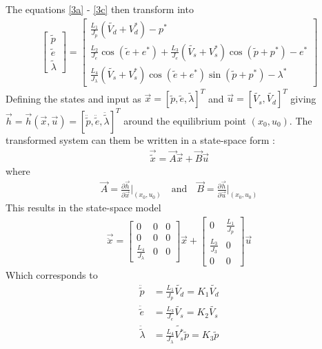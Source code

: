 %
The equations \ref{3a} - \ref{3c} then transform into
%
\setcounter{equation}{3}
\begin{align}
    \begin{bmatrix}\widetilde{p}\\\widetilde{e}\\\widetilde{\lambda} \end{bmatrix}
    = \begin{bmatrix}\frac{L_1}{J_p}(\tilde{V_d}+V_d^*) - p^*  \\ 
    \frac{L_2}{J_e}\cos(\widetilde e + e^*)+\frac{L_3}{J_e}(\tilde{V_s}+V_s^*)\cos(\widetilde{p}+p^*) - e^*  \\  
    \frac{L_4}{J_\lambda}(\tilde{V_s}+V_s^*)\cos(\widetilde{e}+e^*)\sin(\widetilde{p}+p^*) - \lambda^*  \end{bmatrix} %
\end{align}
%
Defining the states and input as $\vec{x} = [\widetilde{p},\widetilde{e},\widetilde{\lambda}]^T$ and $\vec{u} = [\tilde{V_s},\tilde{V_d}]^T$ giving $\vec{h} = \vec{h}(\vec{x},\vec{u}) = [\ddot{\widetilde{p}},\ddot{\widetilde{e}},\ddot{\widetilde{\lambda}}]^T$ around the equilibrium point $(x_0,u_0)$. The transformed system can them be written in a state-space form \cite{chen2014linear}:
%
\begin{align*}
    \vec{\widetilde{x}} = \vec{A}\vec{x} + \vec{B}\vec{u}
\end{align*}
%
where 
%
\begin{align*}
    \vec{A} = \frac{\partial\vec{h}}{\partial\vec{x}}\bigg|_{(x_0,u_0)}
    \quad\text{and}\quad
    \vec{B} = \frac{\partial\vec{h}}{\partial\vec{u}}\bigg|_{(x_0,u_0)}
\end{align*} 
%
This results in the state-space model
%
\begin{align}
    \vec{\ddot{x}} = 
    \begin{bmatrix}0&0&0\\0&0&0\\\frac{L_4}{J_\lambda}&0&0
    \end{bmatrix}
    \vec{x} + 
    \begin{bmatrix}0&\frac{L_1}{J_p}\\\frac{L_3}{J_3}&0\\0&0
    \end{bmatrix}
    \vec{u} %
\end{align}
%
Which corresponds to
\begin{subequations}
\begin{align}
    \ddot{\widetilde{p}} &= \frac{L_1}{J_p}\tilde{V_d} = K_1\tilde{V_d}   \\%
    \ddot{\widetilde{e}} &= \frac{L_3}{J_e}\tilde{V_s} = K_2\tilde{V_s}   \\%
    \ddot{\widetilde{\lambda}} &= \frac{L_4}{J_\lambda}\tilde{V_s^*}\widetilde{p} = K_3\widetilde{p} \label{eq:6c}
\end{align}
\end{subequations}

